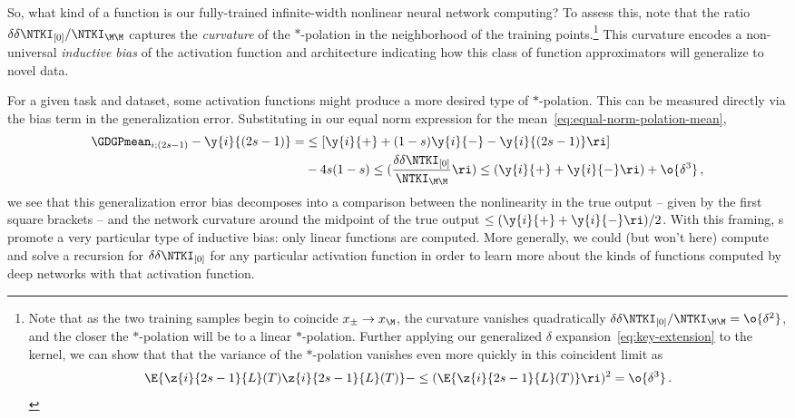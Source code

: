 So, what kind of a function is our fully-trained infinite-width nonlinear neural network computing? 
To assess this, note that the ratio $\delta\delta\NTKI_{[0]}/\NTKI_{\M\M}$ captures the \emph{curvature} of the $\ast$-polation in the neighborhood of the training points.\footnote{Note that as the two training samples  begin to coincide $x_\pm \to x_\M$, the curvature vanishes quadratically $\delta\delta\NTKI_{[0]}/\NTKI_{\M\M} =\o{\delta^2}$, and the closer the $\ast$-polation will be to a linear $\ast$-polation. Further applying our generalized $\delta$ expansion~\eqref{eq:key-extension} to the kernel, we can show that that the variance of the $\ast$-polation vanishes even more quickly in this coincident limit as
\begin{align}
 \E{\z{i}{2s-1}{L}(T)\z{i}{2s-1}{L}(T)}-\le(\E{\z{i}{2s-1}{L}(T)}\ri)^2=\o{\delta^3}\, .
\end{align}
}
This curvature encodes a non-universal \emph{inductive bias} of the activation function and architecture indicating how this class of function approximators will generalize to novel data.

For a given task and dataset, some activation functions might produce a more desired type of $\ast$-polation. This can be measured directly via the bias term in the generalization error. Substituting in our equal norm expression for the mean~\eqref{eq:equal-norm-polation-mean},
\begin{align}\label{eq:polation-bias}
\GDGPmean_{i;(2s-1)}-\y{i}{(2s-1)} =& \le[\y{i}{+}+(1-s)\y{i}{-}-\y{i}{(2s-1)}\ri]  \notag \\
      &-4s(1-s)\le(\frac{\delta\delta\NTKI_{[0]}}{\NTKI_{\M\M}}\ri)\le(\y{i}{+}+\y{i}{-}\ri)+\o{\delta^3} \, ,
\end{align}
we see that this generalization error bias decomposes into a comparison between the nonlinearity in the true output -- given by the first square brackets -- and the network curvature around the midpoint of the true output $\le(\y{i}{+}+\y{i}{-}\ri)/2$.
With this framing, s promote a very particular type of inductive bias: only linear functions are computed. %
More generally, we could (but won't here)
compute and solve a recursion for $\delta\delta\NTKI_{[0]}$ for any particular activation function in order to learn more about the kinds of functions computed by deep networks with that activation function.

